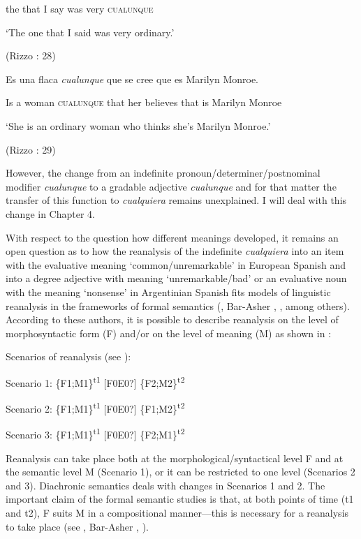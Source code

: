 \documentclass[output=paper]{langscibook}
\begin{document}
  the  that  I  say  was  very  \textsc{cualunque} 

  ‘The one that I said was very ordinary.’

  (Rizzo \citealt{Salierno2013}: 28)

  Es  una  flaca  \textit{cualunque} que  se  cree  que  es  Marilyn Monroe.

  Is  a  woman  \textsc{cualunque} that  her  believes  that  is  Marilyn Monroe

  ‘She is an ordinary woman who thinks she’s Marilyn Monroe.’

  (Rizzo \citealt{Salierno2013}: 29)

However, the change from an indefinite pronoun/determiner/postnominal modifier \textit{cualunque} to a gradable adjective \textit{cualunque} and for that matter the transfer of this function to \textit{cualquiera} remains unexplained. I will deal with this change in Chapter 4. 

  With respect to the question how different meanings developed, it remains an open question as to how the reanalysis of the indefinite \textit{cualquiera} into an item with the evaluative meaning ‘common/unremarkable’ in European Spanish and into a degree adjective with meaning ‘unremarkable/bad’ or an evaluative noun with the meaning ‘nonsense’ in Argentinian Spanish fits models of linguistic reanalysis in the frameworks of formal semantics (\citealt{Eckardt2006}, Bar-Asher \citealt{Siegal2015}, \citealt{Aloni2021}, among others). According to these authors, it is possible to describe reanalysis on the level of morphosyntactic form (F) and/or on the level of meaning (M) as shown in :

\label{bkm:Ref65487536}  Scenarios of reanalysis (see \citealt{Aloni2021}):

  Scenario 1:    \{F1;M1\}\textsuperscript{t1} [F0E0?] \{F2;M2\}\textsuperscript{t2}

  Scenario 2:    \{F1;M1\}\textsuperscript{t1} [F0E0?] \{F1;M2\}\textsuperscript{t2}

  Scenario 3:    \{F1;M1\}\textsuperscript{t1} [F0E0?] \{F2;M1\}\textsuperscript{t2}

Reanalysis can take place both at the morphological/syntactical level F and at the semantic level M (Scenario 1), or it can be restricted to one level (Scenarios 2 and 3). Diachronic semantics deals with changes in Scenarios 1 and 2. The important claim of the formal semantic studies is that, at both points of time (t1 and t2), F suits M in a compositional manner—this is necessary for a reanalysis to take place (see \citealt{Eckardt2006}, Bar-Asher \citealt{Siegal2015}, \citealt{Aloni2021}).
\end{document}
